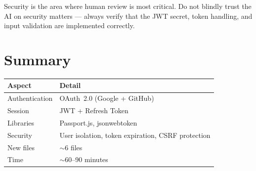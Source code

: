 \begin{dangerbox}
Security is the area where human review is most critical. Do not blindly trust the AI on security matters --- always verify that the JWT secret, token handling, and input validation are implemented correctly.
\end{dangerbox}

\section*{Summary}

\begin{center}
\begin{tabularx}{\textwidth}{l X}
\toprule
\textbf{Aspect} & \textbf{Detail} \\
\midrule
Authentication & OAuth~2.0 (Google + GitHub) \\
Session & JWT + Refresh Token \\
Libraries & Passport.js, jsonwebtoken \\
Security & User isolation, token expiration, CSRF protection \\
New files & $\sim$6 files \\
Time & $\sim$60--90 minutes \\
\bottomrule
\end{tabularx}
\end{center}
